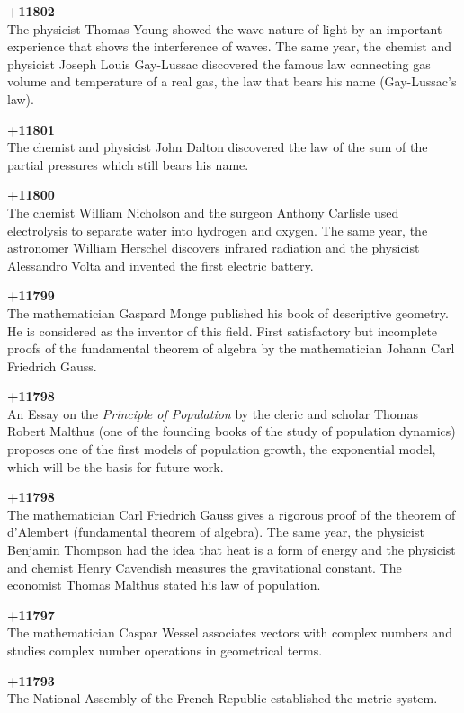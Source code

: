 \textbf{+11802}\\
The physicist Thomas Young showed the wave nature of light by an important experience that shows the interference of waves. The same year, the chemist and physicist Joseph Louis Gay-Lussac discovered the famous law connecting gas volume and temperature of a real gas, the law that bears his name (Gay-Lussac's law).

\textbf{+11801}\\
The chemist and physicist John Dalton discovered the law of the sum of the partial pressures which still bears his name.

\textbf{+11800}\\
The chemist William Nicholson and the surgeon Anthony Carlisle used electrolysis to separate water into hydrogen and oxygen. The same year, the astronomer William Herschel discovers infrared radiation and the physicist Alessandro Volta and invented the first electric battery.

\textbf{+11799}\\
The mathematician Gaspard Monge published his book of descriptive geometry. He is considered as the inventor of this field. First satisfactory but incomplete proofs of the fundamental theorem of algebra by the mathematician Johann Carl Friedrich Gauss.

\textbf{+11798}\\
An Essay on the \textit{Principle of Population} by the cleric and scholar Thomas Robert Malthus (one of the founding books of the study of population dynamics) proposes one of the first models of population growth, the exponential model, which will be the basis for future work.

\textbf{+11798}\\
The mathematician Carl Friedrich Gauss gives a rigorous proof of the theorem of d'Alembert (fundamental theorem of algebra). The same year, the physicist Benjamin Thompson had the idea that heat is a form of energy and the physicist and chemist Henry Cavendish measures the gravitational constant. The economist Thomas Malthus stated his law of population.

\textbf{+11797}\\
The mathematician Caspar Wessel associates vectors with complex numbers and studies complex number operations in geometrical terms.

\textbf{+11793}\\
The National Assembly of the French Republic established the metric system.

